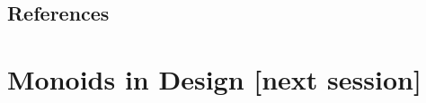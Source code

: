 \documentclass{beamer}
\begin{document}
\subsection{References}

\section{Monoids in Design \color[rgb]{0.5,0.1,0.9}[next session]}






\end{document}

